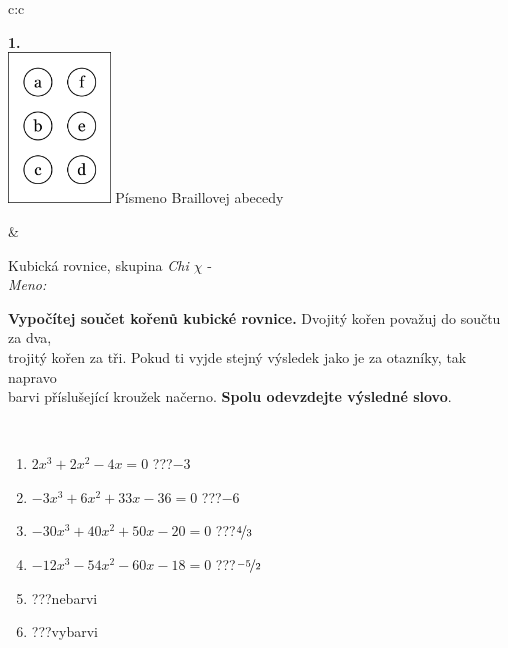 \documentclass[10pt]{report}
\begin{document}
\begin{tabular}{c:c}
\begin{minipage}[c][104.5mm][t]{0.5\linewidth}
\begin{center}
\begin{minipage}{0.20\linewidth}
\begin{center}
{\Huge\bfseries 1.} \\[2mm]
\includegraphics[height=40mm]{../images/braille.png}
{\small Písmeno Braillovej abecedy}
\end{center}
\end{minipage}
\end{center}
\end{minipage}
&
\begin{minipage}[c][104.5mm][t]{0.5\linewidth}
\begin{center}
\vspace{7mm}
{\huge Kubická rovnice, skupina \textit{Chi $\chi$} -}\\[5mm]
\textit{Meno:}\phantom{xxxxxxxxxxxxxxxxxxxxxxxxxxxxxxxxxxxxxxxxxxxxxxxxxxxxxxxxxxxxxxxxx}\\[5mm]
\begin{minipage}{0.95\linewidth}
\textbf{Vypočítej součet kořenů kubické rovnice.} Dvojitý kořen považuj do součtu za dva,\\trojitý kořen za tři. Pokud ti vyjde stejný výsledek jako je za otazníky, tak napravo\\barvi příslušející kroužek načerno. \textbf{Spolu odevzdejte výsledné slovo}.
\end{minipage}
\\[1mm]
\begin{minipage}{0.79\linewidth}
\begin{center}
\begin{varwidth}{\linewidth}
\begin{enumerate}
\Large
\item $2x^3+2x^2-4x=0$\quad \dotfill\; ???\;\dotfill \quad $-3$
\item $-3x^3+6x^2+33x-36=0$\quad \dotfill\; ???\;\dotfill \quad $-6$
\item $-30x^3+40x^2+50x-20=0$\quad \dotfill\; ???\;\dotfill \quad $\nicefrac{4}{3}$
\item $-12x^3-54x^2-60x-18=0$\quad \dotfill\; ???\;\dotfill \quad $\nicefrac{-5}{2}$
\item \quad \dotfill\; ???\;\dotfill \quad nebarvi
\item \quad \dotfill\; ???\;\dotfill \quad vybarvi

\end{enumerate}
\end{varwidth}
\end{center}
\end{minipage}
\end{center}
\end{minipage}
\end{tabular}
\end{document}
